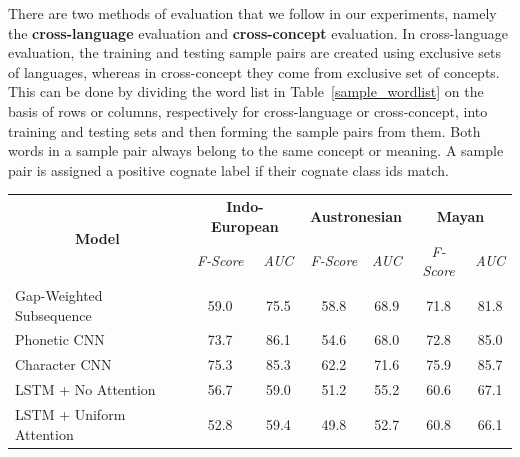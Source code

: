 \documentclass[11pt,letterpaper]{article}
\begin{document}
There are two methods of evaluation that we follow in our experiments, namely the \textbf{cross-language} evaluation and \textbf{cross-concept} evaluation. In cross-language evaluation, the training and testing sample pairs are created using exclusive sets of languages, whereas in cross-concept they come from exclusive set of concepts. This can be done by dividing the word list in Table~\ref{sample_wordlist} on the basis of rows or columns, respectively for cross-language or cross-concept, into training and testing sets and then forming the sample pairs from them. Both words in a sample pair always belong to the same concept or meaning. A sample pair is assigned a positive cognate label if their cognate class ids match. 

\begin{table}[t]
\centering
\begin{tabular}{|l|cc|cc|cc|}
\hline
\multicolumn{1}{|c|}{\multirow{2}{*}{\textbf{Model}}} & \multicolumn{2}{c}{\textbf{Indo-European}}                              & \multicolumn{2}{|c|}{\textbf{Austronesian}} & \multicolumn{2}{|c|}{\textbf{Mayan}} \\ \cline{2-7} 
\multicolumn{1}{|c|}{}                                & \textit{F-Score} & \textit{AUC} & \textit{F-Score}      & \textit{AUC}      & \textit{F-Score}  & \textit{AUC}   \\ \hline 
Gap-Weighted Subsequence                            & 59.0                                 & 75.5                             & 58.8                  & 68.9              & 71.8              & 81.8           \\
Phonetic CNN                                        & 73.7                                 & 86.1                             & 54.6                  & 68.0              & 72.8              & 85.0           \\
Character CNN                                       & 75.3                                 & 85.3                             & 62.2                  & 71.6              & 75.9              & 85.7           \\
LSTM + No Attention                                 & 56.7                                 & 59.0                             & 51.2                  & 55.2              & 60.6              & 67.1           \\
LSTM + Uniform Attention                            & 52.8                                 & 59.4                             & 49.8                  & 52.7              & 60.8              & 66.1           \\ \hline

\end{tabular}
\end{table}
\end{document}
